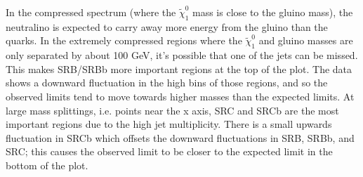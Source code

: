     In the compressed spectrum (where the $\widetilde{\chi}^0_1$ mass is close to the gluino mass), the neutralino is expected to carry away more energy from the gluino than the quarks. In the extremely compressed regions where the $\widetilde{\chi}^0_1$ and gluino masses are only separated by about 100 GeV, it's possible that one of the jets can be missed. This makes SRB/SRBb more important regions at the top of the plot. The data shows a downward fluctuation in the high \MET bins of those regions, and so the observed limits tend to move towards higher masses than the expected limits. At large mass splittings, i.e. points near the x axis, SRC and SRCb are the most important regions due to the high jet multiplicity. There is a small upwards fluctuation in SRCb which offsets the downward fluctuations in SRB, SRBb, and SRC; this causes the observed limit to be closer to the expected limit in the bottom of the plot.

